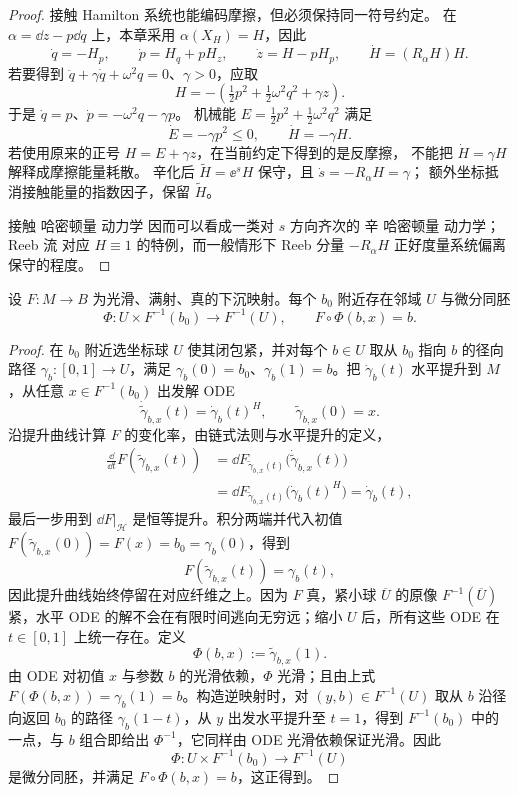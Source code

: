 \begin{proof}
接触 Hamilton 系统也能编码摩擦，但必须保持同一符号约定。
在 $\alpha=\dd z-p\dd q$ 上，本章采用 $\alpha(X_H)=H$，因此
\[
\dot q=-H_p,\qquad\dot p=H_q+pH_z,
\qquad\dot z=H-pH_p,
\qquad\dot H=(R_\alpha H)H.
\]
若要得到 $\ddot q+\gamma\dot q+\omega^2q=0$、$\gamma>0$，应取
\[
H=-\left(\tfrac12p^2+\tfrac12\omega^2q^2+\gamma z\right).
\]
于是 $\dot q=p$、$\dot p=-\omega^2q-\gamma p$。
机械能 $E=\tfrac12p^2+\tfrac12\omega^2q^2$ 满足
\[
\dot E=-\gamma p^2\le0,\qquad\dot H=-\gamma H.
\]
若使用原来的正号 $H=E+\gamma z$，在当前约定下得到的是反摩擦，
不能把 $\dot H=\gamma H$ 解释成摩擦能量耗散。
辛化后 $\widetilde H=\ee^sH$ 保守，且 $\dot s=-R_\alpha H=\gamma$；
额外坐标抵消接触能量的指数因子，保留 $\widetilde H$。

接触 哈密顿量 动力学 因而可以看成一类对 $s$ 方向齐次的 辛 哈密顿量 动力学；Reeb 流 对应 $H\equiv1$ 的特例，而一般情形下 Reeb 分量 $-R_\alpha H$ 正好度量系统偏离保守的程度。
\end{proof}

\begin{theorem}
设 $F:M\to B$ 为光滑、满射、真的下沉映射。每个 $b_0$ 附近存在邻域 $U$ 与微分同胚\[\Phi:U\times F^{-1}(b_0)\to F^{-1}(U),\qquad F\circ\Phi(b,x)=b.\]
\end{theorem}

\begin{proof}
在 $b_0$ 附近选坐标球 $U$ 使其闭包紧，并对每个 $b\in U$ 取从 $b_0$ 指向 $b$ 的径向路径 $\gamma_b:[0,1]\to U$，满足 $\gamma_b(0)=b_0$、$\gamma_b(1)=b$。把 $\dot\gamma_b(t)$ 水平提升到 $M$，从任意 $x\in F^{-1}(b_0)$ 出发解 ODE
\[
\dot{\widetilde\gamma}_{b,x}(t)
=\dot\gamma_b(t)^H,
\qquad
\widetilde\gamma_{b,x}(0)=x.
\]
沿提升曲线计算 $F$ 的变化率，由链式法则与水平提升的定义，
\begin{align*}
\frac{\dd}{\dd t}F(\widetilde\gamma_{b,x}(t))
&=\dd F_{\widetilde\gamma_{b,x}(t)}\bigl(\dot{\widetilde\gamma}_{b,x}(t)\bigr)\\
&=\dd F_{\widetilde\gamma_{b,x}(t)}\bigl(\dot\gamma_b(t)^H\bigr)
=\dot\gamma_b(t),
\end{align*}
最后一步用到 $\dd F|_{\mathcal H}$ 是恒等提升。积分两端并代入初值 $F(\widetilde\gamma_{b,x}(0))=F(x)=b_0=\gamma_b(0)$，得到
\[
F(\widetilde\gamma_{b,x}(t))=\gamma_b(t),
\]
因此提升曲线始终停留在对应纤维之上。因为 $F$ 真，紧小球 $\overline U$ 的原像 $F^{-1}(\overline U)$ 紧，水平 ODE 的解不会在有限时间逃向无穷远；缩小 $U$ 后，所有这些 ODE 在 $t\in[0,1]$ 上统一存在。定义
\[
\Phi(b,x):=\widetilde\gamma_{b,x}(1).
\]
由 ODE 对初值 $x$ 与参数 $b$ 的光滑依赖，$\Phi$ 光滑；且由上式 $F(\Phi(b,x))=\gamma_b(1)=b$。构造逆映射时，对 $(y,b)\in F^{-1}(U)$ 取从 $b$ 沿径向返回 $b_0$ 的路径 $\gamma_b(1-t)$，从 $y$ 出发水平提升至 $t=1$，得到 $F^{-1}(b_0)$ 中的一点，与 $b$ 组合即给出 $\Phi^{-1}$，它同样由 ODE 光滑依赖保证光滑。因此
\[
\Phi:U\times F^{-1}(b_0)\to F^{-1}(U)
\]
是微分同胚，并满足 $F\circ\Phi(b,x)=b$，这正得到。
\end{proof}

